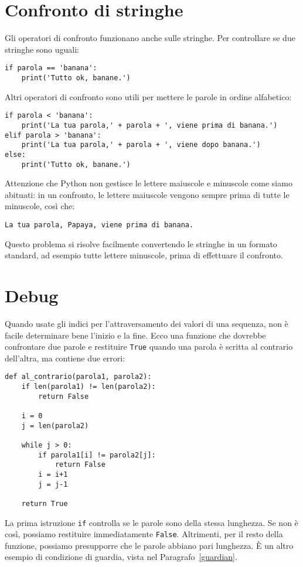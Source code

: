 \documentclass[10pt]{book}
\begin{document}
\section{Confronto di stringhe}

Gli operatori di confronto funzionano anche sulle stringhe. Per controllare se
due stringhe sono uguali:

\begin{verbatim}
if parola == 'banana':
    print('Tutto ok, banane.')
\end{verbatim}
%
Altri operatori di confronto sono utili per mettere le parole in ordine alfabetico:

\begin{verbatim}
if parola < 'banana':
    print('La tua parola,' + parola + ', viene prima di banana.')
elif parola > 'banana':
    print('La tua parola,' + parola + ', viene dopo banana.')
else:
    print('Tutto ok, banane.')
\end{verbatim}
%
Attenzione che Python non gestisce le lettere maiuscole e minuscole come siamo abituati: in un confronto, le lettere maiuscole vengono sempre prima di tutte le minuscole, così che:

\begin{verbatim}
La tua parola, Papaya, viene prima di banana.
\end{verbatim}
%
Questo problema si risolve facilmente convertendo le stringhe in un formato standard, ad esempio tutte lettere minuscole, prima di effettuare il confronto.


\section{Debug}

Quando usate gli indici per l'attraversamento dei valori di una sequenza, non è facile determinare bene l'inizio e la fine. Ecco una funzione che dovrebbe confrontare due parole e restituire {\tt True} quando una parola è scritta al contrario dell'altra, ma contiene due errori:

\begin{verbatim}
def al_contrario(parola1, parola2):
    if len(parola1) != len(parola2):
        return False
    
    i = 0
    j = len(parola2)

    while j > 0:
        if parola1[i] != parola2[j]:
            return False
        i = i+1
        j = j-1

    return True
\end{verbatim}
%
La prima istruzione {\tt if} controlla se le parole sono della stessa lunghezza. Se non è così, possiamo restituire immediatamente {\tt False}. Altrimenti, per il resto della funzione, possiamo presupporre che le parole abbiano pari lunghezza. È un altro esempio di condizione di guardia, vista nel Paragrafo~\ref{guardian}.
\end{document}

